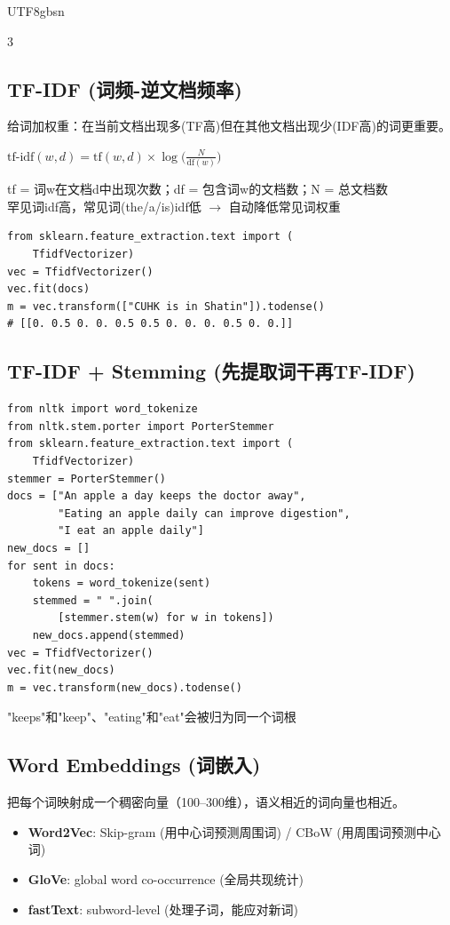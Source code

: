 \documentclass[9pt,landscape,a4paper]{article}
\newcommand{\zhint}[1]{{\scriptsize\color{gray!70!black}#1}}
\begin{document}
\begin{CJK}{UTF8}{gbsn}
\begin{multicols}{3}
\subsection{TF-IDF \zhint{(词频-逆文档频率)}}
\zhint{给词加权重：在当前文档出现多(TF高)但在其他文档出现少(IDF高)的词更重要。}

\vspace{2pt}
$\text{tf-idf}(w,d) = \text{tf}(w,d) \times \log\!\Big(\frac{N}{\text{df}(w)}\Big)$
\vspace{2pt}

\zhint{tf = 词w在文档d中出现次数；df = 包含词w的文档数；N = 总文档数}\\
\zhint{罕见词idf高，常见词(the/a/is)idf低 $\to$ 自动降低常见词权重}

\begin{lstlisting}
from sklearn.feature_extraction.text import (
    TfidfVectorizer)
vec = TfidfVectorizer()
vec.fit(docs)
m = vec.transform(["CUHK is in Shatin"]).todense()
# [[0. 0.5 0. 0. 0.5 0.5 0. 0. 0. 0.5 0. 0.]]
\end{lstlisting}

\subsection{TF-IDF + Stemming \zhint{(先提取词干再TF-IDF)}}

\begin{lstlisting}
from nltk import word_tokenize
from nltk.stem.porter import PorterStemmer
from sklearn.feature_extraction.text import (
    TfidfVectorizer)
stemmer = PorterStemmer()
docs = ["An apple a day keeps the doctor away",
        "Eating an apple daily can improve digestion",
        "I eat an apple daily"]
new_docs = []
for sent in docs:
    tokens = word_tokenize(sent)
    stemmed = " ".join(
        [stemmer.stem(w) for w in tokens])
    new_docs.append(stemmed)
vec = TfidfVectorizer()
vec.fit(new_docs)
m = vec.transform(new_docs).todense()
\end{lstlisting}
\zhint{"keeps"和"keep"、"eating"和"eat"会被归为同一个词根}

\subsection{Word Embeddings \zhint{(词嵌入)}}
\zhint{把每个词映射成一个稠密向量（100--300维），语义相近的词向量也相近。}

\begin{itemize}[leftmargin=*, nosep, itemsep=0pt]
    \item \textbf{Word2Vec}: Skip-gram \zhint{(用中心词预测周围词)} / CBoW \zhint{(用周围词预测中心词)}
    \item \textbf{GloVe}: global word co-occurrence \zhint{(全局共现统计)}
    \item \textbf{fastText}: subword-level \zhint{(处理子词，能应对新词)}
\end{itemize}


\end{multicols}
\end{CJK}
\end{document}
